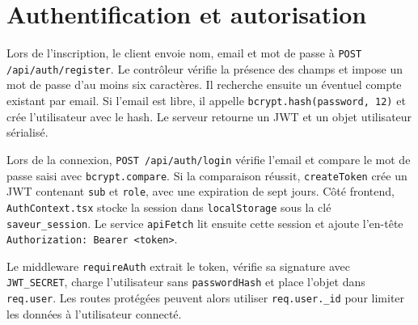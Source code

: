 \documentclass[12pt,a4paper]{report}
\begin{document}
\section{Authentification et autorisation}
Lors de l'inscription, le client envoie nom, email et mot de passe à \texttt{POST /api/auth/register}. Le contrôleur vérifie la présence des champs et impose un mot de passe d'au moins six caractères. Il recherche ensuite un éventuel compte existant par email. Si l'email est libre, il appelle \texttt{bcrypt.hash(password, 12)} et crée l'utilisateur avec le hash. Le serveur retourne un JWT et un objet utilisateur sérialisé.

Lors de la connexion, \texttt{POST /api/auth/login} vérifie l'email et compare le mot de passe saisi avec \texttt{bcrypt.compare}. Si la comparaison réussit, \texttt{createToken} crée un JWT contenant \texttt{sub} et \texttt{role}, avec une expiration de sept jours. Côté frontend, \texttt{AuthContext.tsx} stocke la session dans \texttt{localStorage} sous la clé \texttt{saveur\_session}. Le service \texttt{apiFetch} lit ensuite cette session et ajoute l'en-tête \texttt{Authorization: Bearer <token>}.

Le middleware \texttt{requireAuth} extrait le token, vérifie sa signature avec \texttt{JWT\_SECRET}, charge l'utilisateur sans \texttt{passwordHash} et place l'objet dans \texttt{req.user}. Les routes protégées peuvent alors utiliser \texttt{req.user.\_id} pour limiter les données à l'utilisateur connecté.
\end{document}
